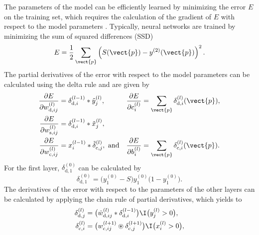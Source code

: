 The parameters of the model can be efficiently learned by minimizing the error
$E$ on the training set, which requires the calculation of the gradient of $E$
with respect to the model parameters \cite{LeCun1998}. Typically, neural
networks are trained by minimizing the sum of squared differences (SSD)
\begin{equation}
E = \frac{1}{2}\sum_{\vect{p}}\left(S(\vect{p}) -
y^{(2)}(\vect{p})\right)^2.
\end{equation}
The partial derivatives of the error with respect to the model parameters can be
calculated using the delta rule and are given by 
\begin{align}
\label{eq:dEd}
\frac{\partial E}{\partial w^{(l)}_{\text{d},ij}} &=
\delta^{(l-1)}_{\text{d},i} * \tilde{y}^{(l)}_j, &
\frac{\partial E}{\partial c^{(l)}_i} &= \sum_{\vect{p}}
\delta^{(l)}_{\text{d},i}(\vect{p}), \\
\label{eq:dEs}
\frac{\partial E}{\partial w^{(l)}_{\text{s},ij}}
 &= \delta^{(l-1)}_{\text{d},i} * \tilde{x}^{(l)}_j, \\
 \label{eq:dEc}
\frac{\partial E}{\partial w^{(l)}_{\text{c},ij}} 
&= x^{(l-1)}_i * \tilde{\delta}^{(l)}_{\text{c},j},\text{ and}&
\frac{\partial E}{\partial b^{(l)}_i} &= \sum_{\vect{p}}
\delta^{(l)}_{\text{c},i}(\vect{p}).
\end{align}
For the first layer, $\delta^{(0)}_{\text{d},1}$ can be calculated by
\begin{equation}
\delta^{(0)}_{\text{d},1} = \big(y^{(0)}_1
-S\big)y^{(0)}_1\big(1-y^{(0)}_1\big).
\label{eq:delta0}
\end{equation}
The derivatives of the error with respect to the parameters of the other layers
can be calculated by applying the chain rule of partial derivatives, which
yields to
\begin{align}
\label{eq:deltad}
\delta^{(l)}_{\text{d},j} &=
\big(\tilde{w}^{(l)}_{\text{d},ij}*\delta^{(l-1)}_{\text{d},i}\big)\I\big(y^{(l)}_j
> 0\big),\\
\label{eq:deltac}
\delta^{(l)}_{\text{c},i} &=
\big(w^{(l+1)}_{\text{c},ij}\circledast\delta^{(l+1)}_{\text{c},j}\big)\I\big(x^{(l)}_i
> 0\big),
\end{align}

